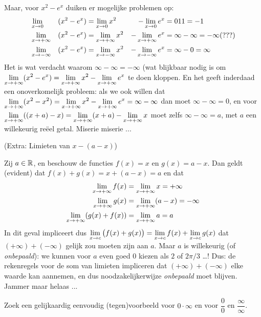 \documentclass[numbers]{ximera}
\begin{document}
\begin{example}
	Maar, voor $x^2 - e^x$ duiken er mogelijke problemen op:
	\begin{alignat*}{6}
		& \limx &(x^2-e^x)   & = \limx x^2   &- \limx e^x   & = 0 1 1 = -1 \\
		& \limxi &(x^2-e^x)  & = \limxi x^2  &- \limxi e^x  & = \infty - \infty = -\infty (???) \\
		& \limxmi &(x^2-e^x) & = \limxmi x^2 &- \limxmi e^x & = \infty - 0 = \infty \\
	\end{alignat*}
	Het is wat verdacht waarom $\infty - \infty = -\infty$ (wat blijkbaar nodig is om $\limxi (x^2-e^x) = \limxi x^2  - \limxi e^x$ te doen kloppen.  En het geeft inderdaad een onoverkomelijk probleem: als we ook willen dat $\limxi (x^2  - x^2) = \limxi x^2  - \limxi e^x  = \infty - \infty$  dan moet $\infty - \infty = 0$, en voor $\limxi ((x+a) - x) = \limxi (x+a) - \limxi x$ moet zelfs $\infty - \infty = a$, met $a$ een willekeurig reëel getal. Miserie miserie ...  

\end{example}
\begin{example}(Extra: Limieten van $x - (a-x)$)
	
	Zij $a\in\mathbb{R}$, en beschouw de functies $f(x)=x$ en $g(x)=a-x$. Dan geldt (evident) dat $f(x)+g(x)=x+(a-x)=a$ en dat 
	\begin{align*}
	\limxi f(x) & = \limxi x = +\infty \\
	\limxi g(x) & = \limxi (a-x) = -\infty \\
	\limxi (g(x)+f(x)) & = \limxi a = a \\
	\end{align*}
	In dit geval impliceert dus $\limxc \big(f(x) +g(x)\big) = \limxc f(x) + \limxc g(x)$ dat $(+\infty) + (-\infty)$ gelijk zou moeten zijn aan $a$. Maar $a$ is willekeurig (of \textit{onbepaald}): we kunnen voor $a$ even goed $0$ kiezen als $2$ of $2\pi/3$ \dots! Dus: de rekenregels voor de som van limieten impliceren dat $(+\infty)+(-\infty)$ elke waarde kan aannemen, en dus noodzakelijkerwijze \textit{onbepaald} moet blijven. Jammer maar helaas ...
	
	
\end{example}
\begin{problem}
	
	Zoek een gelijkaardig eenvoudig (tegen)voorbeeld voor $0\cdot\infty$ en voor $\dfrac00$ en $\dfrac\infty\infty$.
\end{problem}
\end{document}
